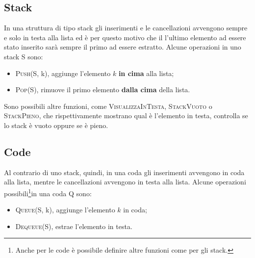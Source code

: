 \subsection{Stack}
In una struttura di tipo stack gli inserimenti e le cancellazioni avvengono sempre e solo in testa alla lista ed è per questo motivo che il l'ultimo elemento ad essere stato inserito sarà sempre il primo ad essere estratto. Alcune operazioni in uno stack S sono:
\begin{itemize}
    \item \textsc{Push}(S, k), aggiunge l'elemento $k$ \textbf{in cima} alla lista;
    \item \textsc{Pop}(S), rimuove il primo elemento \textbf{dalla cima} della lista.
\end{itemize}

Sono possibili altre funzioni, come \textsc{VisualizzaInTesta}, \textsc{StackVuoto} o \textsc{StackPieno}, che rispettivamente mostrano qual è l'elemento in testa, controlla se lo stack è vuoto oppure se è pieno.
\subsection{Code}

Al contrario di uno stack, quindi, in una coda gli inserimenti avvengono in coda alla lista, mentre le cancellazioni avvengono in testa alla lista. Alcune operazioni possibili\footnote{Anche per le code è possibile definire altre funzioni come per gli stack.}in una coda Q sono:
\begin{itemize}
    \item \textsc{Queue}(S, k), aggiunge l'elemento $k$ in coda;
    \item \textsc{Dequeue}(S), estrae l'elemento in testa.
\end{itemize}

